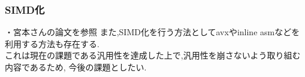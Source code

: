 \subsubsection{SIMD化}
・宮本さんの論文を参照
また,SIMD化を行う方法としてavxやinline asmなどを利用する方法も存在する.\\
これは現在の課題である汎用性を達成した上で,汎用性を崩さないよう取り組む内容であるため,
今後の課題としたい.\\
